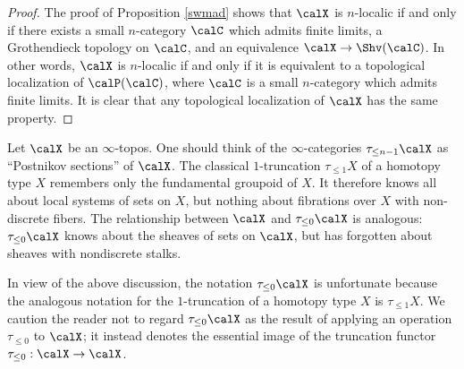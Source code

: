 \begin{proof}
The proof of Proposition \ref{swmad} shows that $\calX$ is $n$-localic if and only if there
exists a small $n$-category $\calC$ which admits finite limits, a Grothendieck topology on $\calC$, and an equivalence $\calX \rightarrow \Shv(\calC)$. In other words, $\calX$ is $n$-localic if and only if it is equivalent to a topological localization of $\calP(\calC)$, where $\calC$ is a small $n$-category which admits finite limits. It is clear that any topological localization of $\calX$ has the same property.
\end{proof}


Let $\calX$ be an $\infty$-topos. One should think of the $\infty$-categories $\tau_{\leq n-1} \calX$ as  ``Postnikov sections'' of $\calX$. The classical $1$-truncation $\tau_{\leq 1} X$ of a
homotopy type $X$ remembers only the fundamental groupoid of $X$.
It therefore knows all about local systems of sets on $X$, but
nothing about fibrations over $X$ with non-discrete fibers. The
relationship between $\calX$ and $\tau_{\leq 0} \calX$ is analogous:
$\tau_{\leq 0} \calX$ knows about the sheaves of sets on $\calX$, but
has forgotten about sheaves with nondiscrete stalks.

\begin{remark}
In view of the above discussion, the notation $\tau_{\leq 0} \calX$ is unfortunate
because the analogous notation for the $1$-truncation of a
homotopy type $X$ is $\tau_{\leq 1} X$. We caution the reader not to
regard $\tau_{\leq 0} \calX$ as the result of applying an operation
$\tau_{\leq 0}$ to $\calX$; it instead denotes the essential image of the truncation
functor  $\tau_{\leq 0}: \calX \rightarrow \calX$.
\end{remark}


